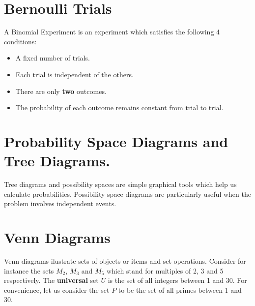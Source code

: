 	\section{Bernoulli Trials}
	A Binomial Experiment is an experiment which satisfies the following 4 conditions:
	\begin{itemize}
		\item {A fixed number of trials.}
		\item {Each trial is independent of the others.}
		\item {There are only \textbf{two} outcomes.}
		\item {The probability of each outcome remains constant from trial to trial.}
	\end{itemize}
	\section{Probability Space Diagrams and Tree Diagrams.}
	Tree diagrams and possibility spaces are simple graphical tools which help us calculate probabilities. Possibility space diagrams are particularly useful when the problem involves independent events.
	\section{Venn Diagrams}
	Venn diagrams ilustrate sets of objects or items and set operations. Consider for instance the sets $M_2$, $M_3$ and $M_5$ which stand for multiples of 2, 3 and 5 respectively. The \textbf{universal} set $U$ is the set of all integers between 1 and 30. For convenience, let us consider the set $P$ to be the set of all primes between 1 and 30.
	
